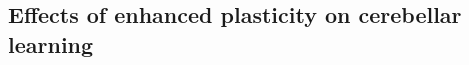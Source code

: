 \documentclass[final]{beamer}%
\begin{document}

\subsection{Effects of enhanced plasticity on cerebellar learning}

%
%
%
%


\end{document}
